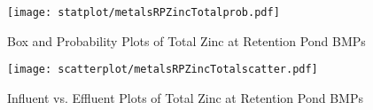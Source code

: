         \begin{figure}[hb]   %
            \centering
            \texttt{[image: statplot/metalsRPZincTotalprob.pdf]}
            \caption{Box and Probability Plots of Total Zinc at Retention Pond BMPs}
        \end{figure}         %
        
        
        \begin{figure}[hb]   %
            \centering
            \texttt{[image: scatterplot/metalsRPZincTotalscatter.pdf]}
            \caption{Influent vs. Effluent Plots of Total Zinc at Retention Pond BMPs}
        \end{figure}         %
        \clearpage
        